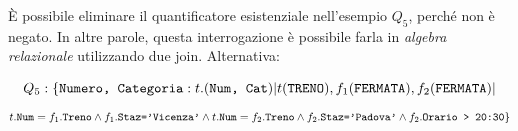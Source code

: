 \documentclass{report}
\begin{document}
\`E possibile eliminare il quantificatore esistenziale nell'esempio $Q_5$, perch\'e non \`e negato. In altre parole, questa interrogazione \`e possibile farla in \emph{algebra relazionale} utilizzando due join. Alternativa:

\[ Q_5: \{\text{\texttt{Numero, Categoria}}:t.(\text{\texttt{Num, Cat}})| t(\text{\texttt{TRENO}}), f_1(\text{\texttt{FERMATA}}), f_2(\text{\texttt{FERMATA}})| \]
\[ t.\text{\texttt{Num}} = f_1.\text{\texttt{Treno}}\wedge f_1.\text{\texttt{Staz='Vicenza'}\\} \wedge t.\text{\texttt{Num}} = f_2.\text{\texttt{Treno}} \wedge f_2.\text{\texttt{Staz='Padova'}} \wedge f_2.\text{\texttt{Orario > 20:30}}\} \]
\end{document}
